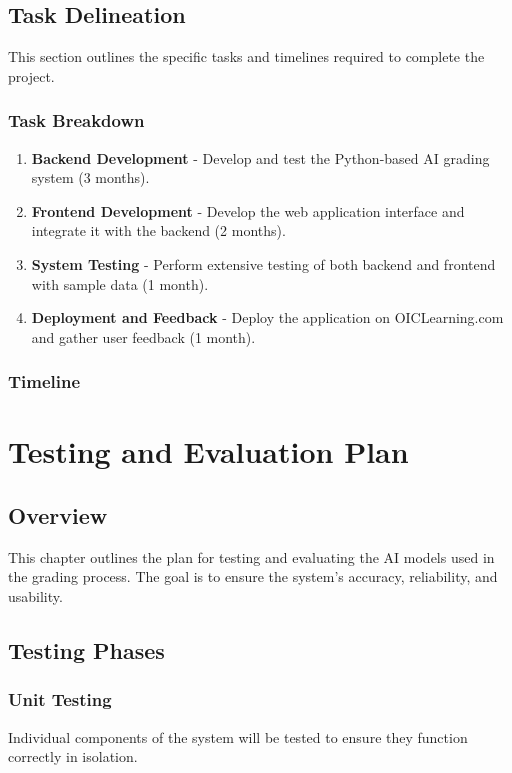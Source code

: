 \documentclass[ms,twoside,print]{nuthesis}
\begin{document}
\section{Task Delineation}
This section outlines the specific tasks and timelines required to complete the project.

\subsection{Task Breakdown}
\begin{enumerate}
    \item \textbf{Backend Development} - Develop and test the Python-based AI grading system (3 months).
    \item \textbf{Frontend Development} - Develop the web application interface and integrate it with the backend (2 months).
    \item \textbf{System Testing} - Perform extensive testing of both backend and frontend with sample data (1 month).
    \item \textbf{Deployment and Feedback} - Deploy the application on OICLearning.com and gather user feedback (1 month).
\end{enumerate}

\subsection{Timeline}

\chapter{Testing and Evaluation Plan}
\section{Overview}
This chapter outlines the plan for testing and evaluating the AI models used in the grading process. The goal is to ensure the system's accuracy, reliability, and usability.

\section{Testing Phases}
\subsection{Unit Testing}
Individual components of the system will be tested to ensure they function correctly in isolation.
\end{document}
